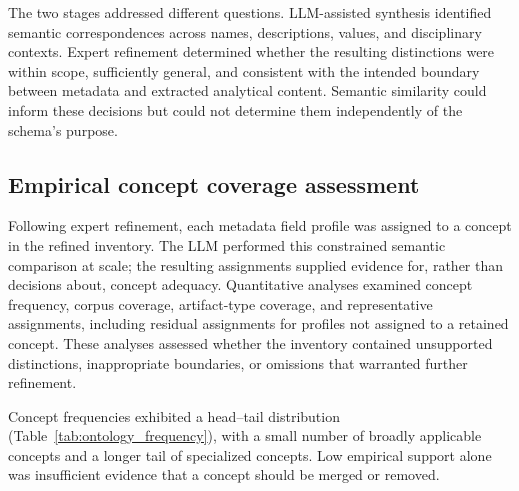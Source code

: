 \documentclass{article}
\begin{document}
The two stages addressed different questions. LLM-assisted synthesis identified semantic correspondences across names, descriptions, values, and disciplinary contexts. Expert refinement determined whether the resulting distinctions were within scope, sufficiently general, and consistent with the intended boundary between metadata and extracted analytical content. Semantic similarity could inform these decisions but could not determine them independently of the schema's purpose.

\subsection{Empirical concept coverage assessment}
\label{sec:validation}

Following expert refinement, each metadata field profile was assigned to a concept in the refined inventory. The LLM performed this constrained semantic comparison at scale; the resulting assignments supplied evidence for, rather than decisions about, concept adequacy. Quantitative analyses examined concept frequency, corpus coverage, artifact-type coverage, and representative assignments, including residual assignments for profiles not assigned to a retained concept. These analyses assessed whether the inventory contained unsupported distinctions, inappropriate boundaries, or omissions that warranted further refinement.

Concept frequencies exhibited a head--tail distribution (Table~\ref{tab:ontology_frequency}), with a small number of broadly applicable concepts and a longer tail of specialized concepts. Low empirical support alone was insufficient evidence that a concept should be merged or removed.
\end{document}
